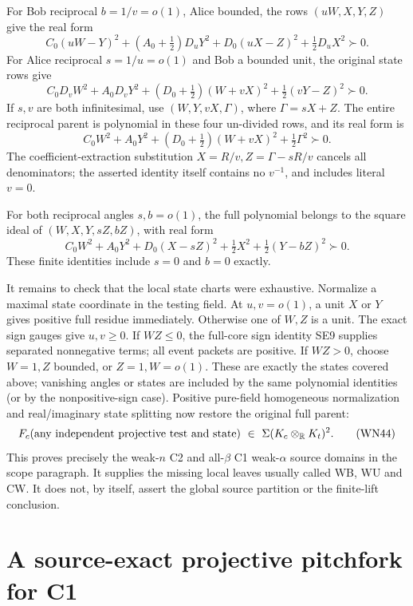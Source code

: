 For Bob reciprocal \(b=1/v=o(1)\), Alice bounded, the rows
\((uW,X,Y,Z)\) give the real form
\[
 C_0(uW-Y)^2+(A_0+\tfrac12)D_uY^2+
                 D_0(uX-Z)^2+\tfrac12D_uX^2\succ0.
 \tag{WN41}
\]
For Alice reciprocal \(s=1/u=o(1)\) and Bob a bounded unit,
the original state rows give
\[
 C_0D_vW^2+A_0D_vY^2+
       (D_0+\tfrac12)(W+vX)^2+\tfrac12(vY-Z)^2\succ0.
\]
If \(s,v\) are both infinitesimal, use
\((W,Y,vX,\Gamma)\), where \(\Gamma=sX+Z\).
The entire reciprocal parent is polynomial in these four
un-divided rows, and its real form is
\[
 C_0W^2+A_0Y^2+
                 (D_0+\tfrac12)(W+vX)^2+\tfrac12\Gamma^2\succ0.
 \tag{WN42}
\]
The coefficient-extraction substitution \(X=R/v,Z=\Gamma-sR/v\)
cancels all denominators; the asserted identity itself contains
no \(v^{-1}\), and includes literal \(v=0\).

For both reciprocal angles \(s,b=o(1)\), the full polynomial
belongs to the square ideal of \((W,X,Y,sZ,bZ)\), with real form
\[
 C_0W^2+A_0Y^2+D_0(X-sZ)^2+
                    \tfrac12X^2+\tfrac12(Y-bZ)^2\succ0.
 \tag{WN43}
\]
These finite identities include \(s=0\) and \(b=0\) exactly.

It remains to check that the local state charts were exhaustive.
Normalize a maximal state coordinate in the testing field.
At \(u,v=o(1)\), a unit \(X\) or \(Y\) gives positive full
residue immediately. Otherwise one of \(W,Z\) is a unit.
The exact sign gauges give \(u,v\geq0\).
If \(WZ\leq0\), the full-core sign identity SE9 supplies
separated nonnegative terms; all event packets are positive.
If \(WZ>0\), choose \(W=1,Z\) bounded, or \(Z=1,W=o(1)\).
These are exactly the states covered above; vanishing angles
or states are included by the same polynomial identities
(or by the nonpositive-sign case).
Positive pure-field homogeneous normalization and real/imaginary
state splitting now restore the original full parent:
\[
 F_c(\hbox{any independent projective test and state})
       \ \in\ \Sigma(K_c\otimes_{\mathbb R}K_t)^2 .
 \tag{WN44}
\]
This proves precisely the weak-\(n\) C2 and all-\(\beta\) C1
weak-\(\alpha\) source domains in the scope paragraph.
It supplies the missing local leaves usually called WB, WU
and CW. It does not, by itself, assert the global source
partition or the finite-lift conclusion.



\section{\texorpdfstring{A source-exact projective pitchfork for C1}{A source-exact projective pitchfork for C1}}
\label{component:p2cdf6197677b}

